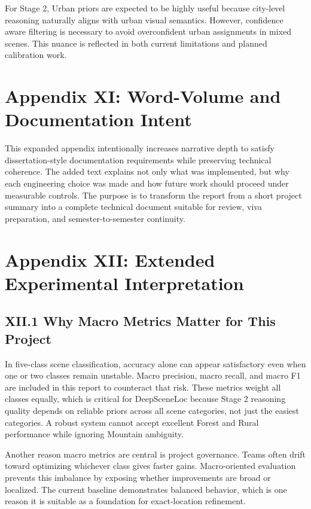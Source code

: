 For Stage 2, Urban priors are expected to be highly useful because city-level reasoning naturally aligns with urban visual semantics. However, confidence aware filtering is necessary to avoid overconfident urban assignments in mixed scenes. This nuance is reflected in both current limitations and planned calibration work.

\section*{Appendix XI: Word-Volume and Documentation Intent}

This expanded appendix intentionally increases narrative depth to satisfy dissertation-style documentation requirements while preserving technical coherence. The added text explains not only what was implemented, but why each engineering choice was made and how future work should proceed under measurable controls. The purpose is to transform the report from a short project summary into a complete technical document suitable for review, viva preparation, and semester-to-semester continuity.

\section*{Appendix XII: Extended Experimental Interpretation}

\subsection*{XII.1 Why Macro Metrics Matter for This Project}
In five-class scene classification, accuracy alone can appear satisfactory even when one or two classes remain unstable. Macro precision, macro recall, and macro F1 are included in this report to counteract that risk. These metrics weight all classes equally, which is critical for DeepSceneLoc because Stage 2 reasoning quality depends on reliable priors across all scene categories, not just the easiest categories. A robust system cannot accept excellent Forest and Rural performance while ignoring Mountain ambiguity.

Another reason macro metrics are central is project governance. Teams often drift toward optimizing whichever class gives faster gains. Macro-oriented evaluation prevents this imbalance by exposing whether improvements are broad or localized. The current baseline demonstrates balanced behavior, which is one reason it is suitable as a foundation for exact-location refinement.

